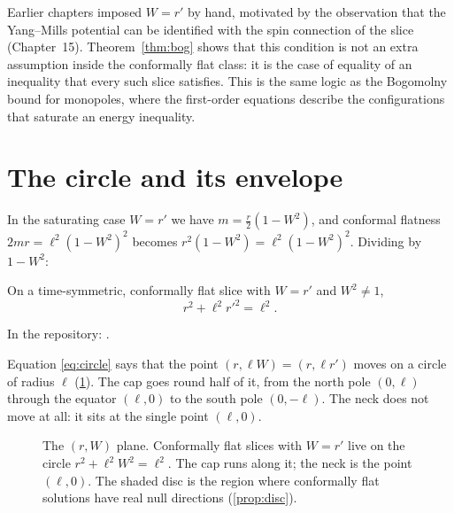 \begin{remark}
Earlier chapters imposed $W=r'$ by hand, motivated by the observation that the Yang--Mills potential can be identified with the spin connection of the slice (Chapter~15). Theorem~\ref{thm:bog} shows that this condition is not an extra assumption inside the conformally flat class: it is the case of equality of an inequality that every such slice satisfies. This is the same logic as the Bogomolny bound for monopoles, where the first-order equations describe the configurations that saturate an energy inequality.
\end{remark}

\section{The circle and its envelope}

In the saturating case $W=r'$ we have $m=\tfrac r2(1-W^2)$, and conformal flatness $2mr=\ell^2(1-W^2)^2$ becomes $r^2(1-W^2)=\ell^2(1-W^2)^2$. Dividing by $1-W^2$:

\begin{theorem}\proved\label{thm:circle}
On a time-symmetric, conformally flat slice with $W=r'$ and $W^2\ne1$,
\begin{equation}\label{eq:circle}
r^2+\ell^2r'^2=\ell^2 .
\end{equation}
\end{theorem}
\noindent In the repository: .

Equation \eqref{eq:circle} says that the point $(r,\ell W)=(r,\ell r')$ moves on a circle of radius $\ell$ (\cref{fig:circle}). The cap goes round half of it, from the north pole $(0,\ell)$ through the equator $(\ell,0)$ to the south pole $(0,-\ell)$. The neck does not move at all: it sits at the single point $(\ell,0)$.

\begin{figure}[h]
\centering
{}
\caption{The $(r,W)$ plane. Conformally flat slices with $W=r'$ live on the circle $r^2+\ell^2W^2=\ell^2$. The cap runs along it; the neck is the point $(\ell,0)$. The shaded disc is the region where conformally flat solutions have real null directions (\cref{prop:disc}).}
\label{fig:circle}
\end{figure}

